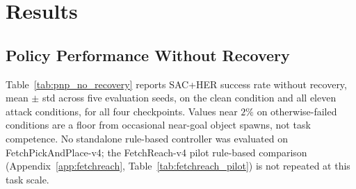 \documentclass[conference]{IEEEtran}
\begin{document}
\section{Results}
\label{sec:results}

\subsection{Policy Performance Without Recovery}

Table~\ref{tab:pnp_no_recovery} reports SAC+HER success rate without recovery, mean
$\pm$ std across five evaluation seeds, on the clean condition and all eleven attack
conditions, for all four checkpoints. Values near $2\%$ on otherwise-failed conditions
are a floor from occasional near-goal object spawns, not task competence. No standalone
rule-based controller was evaluated on FetchPickAndPlace-v4; the FetchReach-v4 pilot
rule-based comparison (Appendix~\ref{app:fetchreach}, Table~\ref{tab:fetchreach_pilot})
is not repeated at this task scale.
\end{document}
